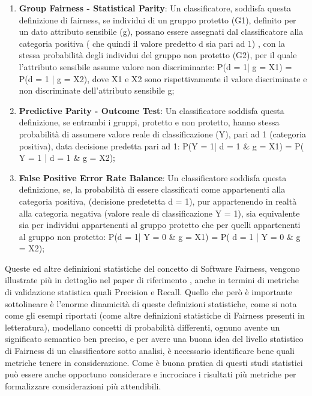  
\begin{enumerate}
     \item \textbf{Group Fairness - Statistical Parity}: Un classificatore, soddisfa questa definizione di fairness, se individui di un gruppo protetto (G1), definito per un dato attributo sensibile (g), possano essere assegnati dal classificatore alla categoria positiva ( che quindi il valore predetto d sia pari ad 1) , con la stessa probabilità degli individui del gruppo non protetto (G2), per il quale l'attributo sensibile assume valore non discriminante: P(d = 1| g = X1) = P(d = 1 | g = X2), dove X1 e X2 sono rispettivamente il valore discriminate e non discriminate dell'attributo sensibile g;
    
     \item \textbf{Predictive Parity - Outcome Test}: Un classificatore soddisfa questa definizione, se entrambi i gruppi, protetto e non protetto, hanno stessa probabilità di assumere valore reale di classificazione (Y), pari ad 1 (categoria positiva), data decisione predetta pari ad 1: P(Y = 1| d = 1 \& g = X1) = P( Y = 1 | d = 1 \& g = X2);
    
     \item \textbf{False Positive Error Rate Balance}: Un classificatore soddisfa questa definizione, se, la probabilità di essere classificati come appartenenti alla categoria positiva, (decisione predetetta d = 1), pur appartenendo in realtà alla categoria negativa (valore reale di classificazione Y = 1), sia equivalente sia per individui appartenenti al gruppo protetto che per quelli appartenenti al gruppo non protetto: P(d = 1| Y = 0 \& g = X1) = P( d = 1 | Y = 0 \& g = X2);
\end{enumerate}

Queste ed altre definizioni statistiche del concetto di Software Fairness, vengono illustrate più in dettaglio nel paper di riferimento \cite{evalFairClassification}, anche in termini di metriche di validazione statistica quali Precision e Recall. Quello che però è importante sottolineare è l'enorme dinamicità di queste definizioni statistiche, come  si nota come gli esempi riportati (come altre definizioni statistiche di Fairness presenti in letteratura), modellano concetti di probabilità differenti, ognuno avente un significato semantico ben preciso, e per avere una buona idea del livello statistico di Fairness di un classificatore sotto analisi, è necessario identificare bene quali metriche tenere in considerazione. Come è buona pratica di questi studi statistici può essere anche opportuno considerare e incrociare i risultati più metriche per formalizzare considerazioni più attendibili.


